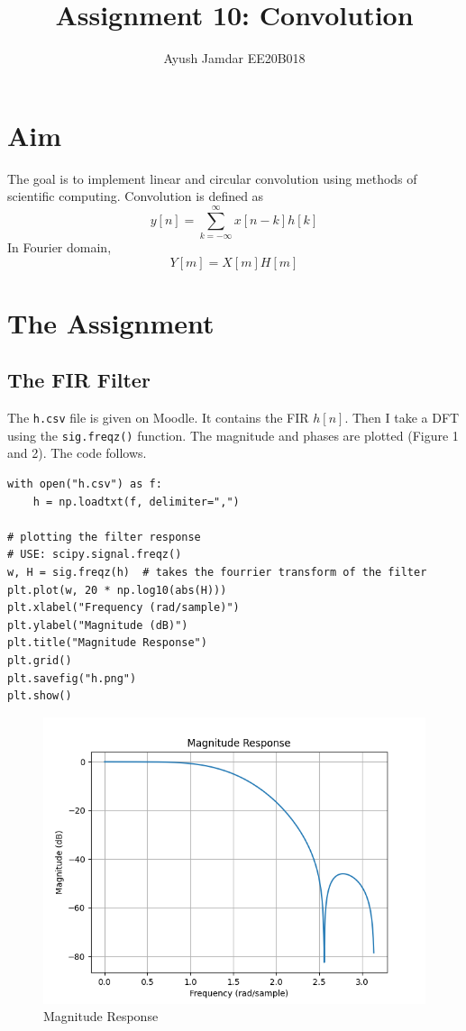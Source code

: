 \documentclass[11pt, a4paper]{article}
\title{Assignment 10: Convolution}
\author{Ayush Jamdar EE20B018} %
\begin{document}
		
		
\maketitle %
\section{Aim}
The goal is to implement linear and circular convolution using methods of scientific computing. 
Convolution is defined as 
$$y[n]=\sum_{k=-\infty}^{\infty}x[n-k]h[k]$$
In Fourier domain, 
$$Y[m]=X[m]H[m]$$

\section{The Assignment}
\subsection{The FIR Filter}
The \texttt{h.csv} file is given on Moodle. It contains the FIR $h[n]$. Then I take a DFT using the \texttt{sig.freqz()} function. The magnitude and phases are plotted (Figure 1 and 2). The code follows. 
\begin{verbatim}
with open("h.csv") as f:
    h = np.loadtxt(f, delimiter=",")

# plotting the filter response
# USE: scipy.signal.freqz()
w, H = sig.freqz(h)  # takes the fourrier transform of the filter
plt.plot(w, 20 * np.log10(abs(H)))
plt.xlabel("Frequency (rad/sample)")
plt.ylabel("Magnitude (dB)")
plt.title("Magnitude Response")
plt.grid()
plt.savefig("h.png")
plt.show()
\end{verbatim}

\begin{figure}[!tbh]
   	\centering
  \includegraphics[scale=0.5]{h.png} 
    \caption{Magnitude Response} 	
   \end{figure}  
   
\end{document}
